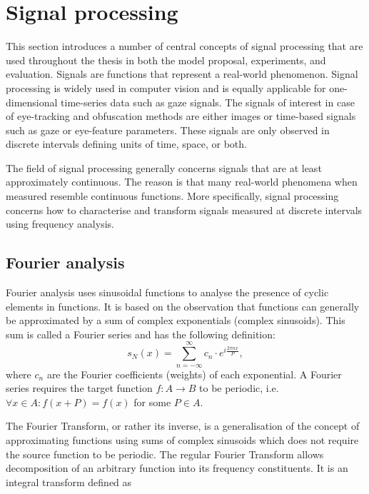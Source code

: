 \section{Signal processing}
This section introduces a number of central concepts of signal processing that are used throughout the thesis in both the model proposal, experiments, and evaluation. Signals are functions that represent a real-world phenomenon. Signal processing is widely used in computer vision and is equally applicable for one-dimensional time-series data such as gaze signals. The signals of interest in case of eye-tracking and obfuscation methods are either images or time-based signals such as gaze or eye-feature parameters. These signals are only observed in discrete intervals defining units of time, space, or both. 

The field of signal processing generally concerns signals that are at least approximately continuous. The reason is that many real-world phenomena when measured resemble continuous functions. More specifically, signal processing concerns how to characterise and transform signals measured at discrete intervals using frequency analysis.




\subsection{Fourier analysis}
Fourier analysis uses sinusoidal functions to analyse the presence of cyclic elements in functions. It is based on the observation that functions can generally be approximated by a sum of complex exponentials (complex sinusoids). This sum is called a Fourier series and has the following definition:
\begin{equation}
    s_N(x) = \sum_{n=-\infty}^{\infty} c_n \cdot e^{i\frac{2\pi n x}{P}},
\end{equation}
where $c_n$ are the Fourier coefficients (weights) of each exponential. A Fourier series requires the target function $f: A \rightarrow B$ to be periodic, i.e. $\forall x\in A: f(x+P) = f(x)$ for some $P\in A$.

The Fourier Transform, or rather its inverse, is a generalisation of the concept of approximating functions using sums of complex sinusoids which does not require the source function to be periodic. The regular Fourier Transform allows decomposition of an arbitrary function into its frequency constituents. It is an integral transform defined as

